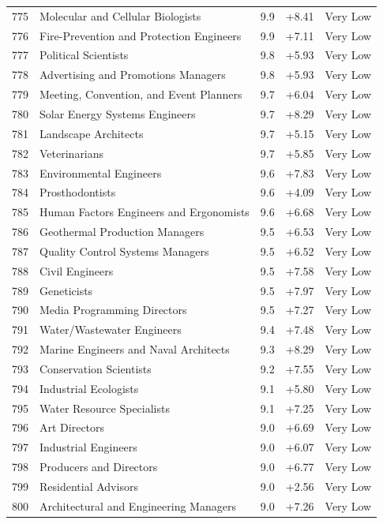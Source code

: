 {\begin{longtable}{rp{7cm}ccc}
775 & Molecular and Cellular Biologists & 9.9 & +8.41 & Very Low \\
776 & Fire-Prevention and Protection Engineers & 9.9 & +7.11 & Very Low \\
777 & Political Scientists & 9.8 & +5.93 & Very Low \\
778 & Advertising and Promotions Managers & 9.8 & +5.93 & Very Low \\
779 & Meeting, Convention, and Event Planners & 9.7 & +6.04 & Very Low \\
780 & Solar Energy Systems Engineers & 9.7 & +8.29 & Very Low \\
781 & Landscape Architects & 9.7 & +5.15 & Very Low \\
782 & Veterinarians & 9.7 & +5.85 & Very Low \\
783 & Environmental Engineers & 9.6 & +7.83 & Very Low \\
784 & Prosthodontists & 9.6 & +4.09 & Very Low \\
785 & Human Factors Engineers and Ergonomists & 9.6 & +6.68 & Very Low \\
786 & Geothermal Production Managers & 9.5 & +6.53 & Very Low \\
787 & Quality Control Systems Managers & 9.5 & +6.52 & Very Low \\
788 & Civil Engineers & 9.5 & +7.58 & Very Low \\
789 & Geneticists & 9.5 & +7.97 & Very Low \\
790 & Media Programming Directors & 9.5 & +7.27 & Very Low \\
791 & Water/Wastewater Engineers & 9.4 & +7.48 & Very Low \\
792 & Marine Engineers and Naval Architects & 9.3 & +8.29 & Very Low \\
793 & Conservation Scientists & 9.2 & +7.55 & Very Low \\
794 & Industrial Ecologists & 9.1 & +5.80 & Very Low \\
795 & Water Resource Specialists & 9.1 & +7.25 & Very Low \\
796 & Art Directors & 9.0 & +6.69 & Very Low \\
797 & Industrial Engineers & 9.0 & +6.07 & Very Low \\
798 & Producers and Directors & 9.0 & +6.77 & Very Low \\
799 & Residential Advisors & 9.0 & +2.56 & Very Low \\
800 & Architectural and Engineering Managers & 9.0 & +7.26 & Very Low \\

\end{longtable}}
